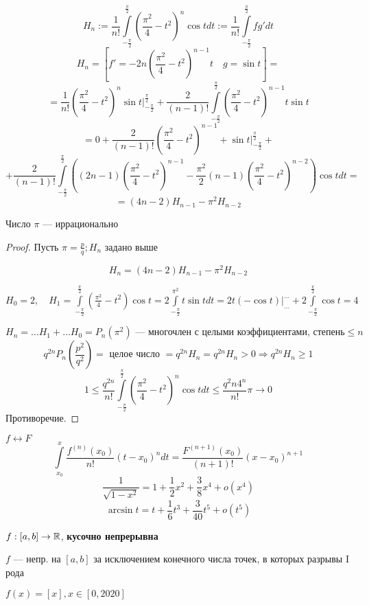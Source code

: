 \begin{example}
    $$H_n:=\frac{1}{n!}\int\limits_{-\frac{\pi}{2}}^{\frac{\pi}{2}}\left(\frac{\pi^2}{4}-t^2\right)^n\cos t dt:=\frac{1}{n!}\int\limits_{-\frac{\pi}{2}}^{\frac{\pi}{2}} fg' dt$$
    $$H_n=\left[f'=-2n\left(\frac{\pi^2}{4}-t^2\right)^{n-1}t \quad g=\sin t\right]=$$
    $$=\frac{1}{n!}\left(\frac{\pi^2}{4}-t^2\right)^n\sin t|_{-\frac{\pi}{2}}^{\frac{\pi}{2}}+\frac{2}{(n-1)!}\int\limits_{-\frac{\pi}{2}}^{\frac{\pi}{2}} \left(\frac{\pi^2}{4}-t^2\right)^{n-1}t\sin t$$
    $$=0+\frac{2}{(n-1)!}\left(\frac{\pi^2}{4}-t^2\right)^{n-1}+\sin t|_{-\frac{\pi}{2}}^{\frac{\pi}{2}}+$$
    $$+\frac{2}{(n-1)!}\int\limits_{-\frac{\pi}{2}}^{\frac{\pi}{2}}\left((2n-1)\left(\frac{\pi^2}{4}-t^2\right)^{n-1}-\frac{\pi^2}{2}(n-1)\left(\frac{\pi^2}{4}-t^2\right)^{n-2}\right)\cos t dt=$$
    $$=(4n-2)H_{n-1}-\pi^2H_{n-2}$$
\end{example}

\begin{theorem}
    Число $\pi$ --- иррационально
\end{theorem}
\begin{proof}
    Пусть $\pi=\frac{p}{q}; H_n$ задано выше

    $$H_n=(4n-2)H_{n-1}-\pi^2 H_{n-2}$$
    
    $H_0 = 2, \quad H_1=\int\limits_{-\frac{\pi}{2}}^{\frac{\pi}{2}}(\frac{\pi^2}{4}-t^2)\cos t = 2\int\limits_{-\frac{\pi}{2}}^{\pi^2} t\sin t dt = 2t(-\cos t)|_{\ldots}^{\ldots}+2\int\limits_{-\frac{\pi}{2}}^{\frac{\pi}{2}} \cos t = 4$

    $$H_n=\ldots H_1+\ldots H_0 = P_n(\pi^2) \text{ --- многочлен с целыми коэффициентами, степень}\leq n$$
    $$q^{2n}P_n\left(\frac{p^2}{q^2}\right)=\text{ целое число }=q^{2n}H_n=q^{2n}H_n>0 \Rightarrow q^{2n}H_n\geq 1$$
    $$1\leq\frac{q^{2n}}{n!}\int\limits_{-\frac{\pi}{2}}^{\frac{\pi}{2}}\left(\frac{\pi^2}{4}-t^2\right)^n\cos t dt \leq \frac{q^2n 4^n}{n!}\pi\to0$$
    Противоречие.
\end{proof}

$f\leftrightarrow F$
$$\int\limits_{x_0}^x\frac{f^{(n)}(x_0)}{n!}(t-x_0)^ndt = \frac{F^{(n+1)}(x_0)}{(n+1)!}(x-x_0)^{n+1}$$
$$\frac{1}{\sqrt{1-x^2}}=1+\frac{1}{2}x^2+\frac{3}{8}x^4+o(x^4)$$
$$\arcsin t = t + \frac{1}{6}t^3 + \frac{3}{40} t^5 + o(t^5)$$

\begin{definition}
    
    $f:[a,b] \to \mathbb{R}$, \textbf{кусочно непрерывна}

    $f$ --- непр. на $[a,b]$ за исключением конечного числа точек, в которых разрывы I рода
    \begin{example}
        $f(x) = [x], x\in[0, 2020]$
    \end{example}
\end{definition}

